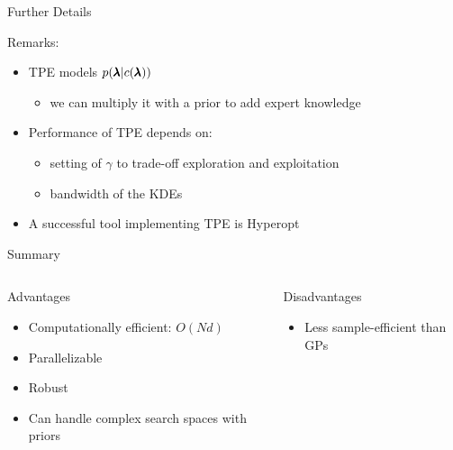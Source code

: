 \begin{frame}[c]{Further Details}

Remarks:

\begin{itemize}
	\item TPE models $p(\pmb{\lambda} | c({\pmb{\lambda}}))$
	\begin{itemize}
		\item we can multiply it with a prior to add expert knowledge
	\end{itemize}
	\smallskip
	
	\fhpause
	
	\item Performance of TPE depends on:
	\begin{itemize}
		\item setting of $\gamma$ to trade-off exploration and exploitation
		\item bandwidth of the KDEs 
	\end{itemize}
	
	\fhpause
	
	\smallskip
	
	\smallskip
	\item A successful tool implementing TPE is Hyperopt 
\end{itemize}

\end{frame}
\begin{frame}[c]{Summary}

\begin{columns}[T] %
\begin{column}{.48\textwidth}
    \begin{block}{Advantages}
    \begin{itemize}
    	\item Computationally efficient: $O(Nd)$
    	\item Parallelizable
    	\item Robust
    	\item Can handle complex search spaces with priors
    \end{itemize}
    \end{block}
\end{column}%

\hfill%

\fhpause

\begin{column}{.48\textwidth}
    \begin{block}{Disadvantages}
    \begin{itemize}
    	\item Less sample-efficient than GPs
    \end{itemize}
    \end{block}
\end{column}
\end{columns}   

\end{frame}
